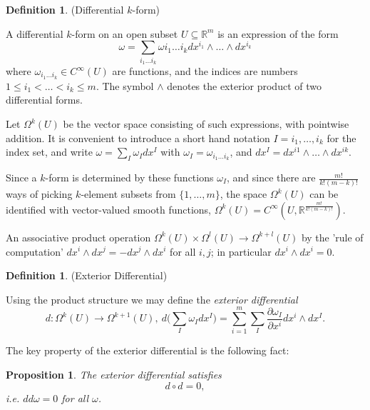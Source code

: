 \documentclass{article}
\newtheorem{proposition}{Proposition}[theorem]
\theoremstyle{definition}
\newtheorem{defn}[theorem]{Definition}
\newenvironment{definition}
  {\vspace{8pt}\begin{mdframed}[backgroundcolor=blueish,innertopmargin=4]\begin{defn}}
  {\end{defn}\end{mdframed}\vspace{4pt}}
\begin{document}
\begin{definition} (Differential $k$-form)

A differential $k$-form on an open subset $U \subseteq \mathbb R^m$ is an expression of the form 
\[
    \omega = \sum_{i_1 \dots i_k} \omega i_1\dots i_k dx^{i_1} \wedge \dots \wedge  dx^{i_k}
\] 
where $\omega_{i_1\dots i_k} \in C^\infty(U)$ are functions, and the indices are numbers $1 \leq i_1 < \dots < i_k \leq m$. The symbol $\wedge$ denotes the exterior product of two differential forms.
\end{definition}

Let $\Omega^k (U)$ be the vector space consisting of such expressions, with pointwise addition. It is convenient to introduce a short hand notation $I = {i_1,\dots,i_k}$ for the index set, and write $\omega = \sum_I \omega_I dx^I$ with $\omega_I = \omega_{i_1 \dots i_k}$, and $dx^I = dx^{i1} \wedge \dots \wedge dx^{ik}$.

Since a $k$-form is determined by these functions $\omega_I$, and since there are $\frac{m!}{k!(m-k)!}$ ways of picking $k$-element subsets from $\{1,\dots,m\}$, the space $\Omega^k (U)$ can be identified with vector-valued smooth functions, $\Omega^k (U) = C^\infty (U, \mathbb R ^{\frac{m!}{k!(m-k)!}})$.

An associative product operation $\Omega^k (U) \times \Omega^l (U) \rightarrow \Omega^{k+l} (U)$ by the 'rule of computation' $dx^i \wedge d x^j = -dx^j \wedge d x^i$ for all $i, j$;  in particular $dx^i \wedge dx^i = 0$.

\begin{definition}(Exterior Differential)

Using the product structure we may define the \textit{exterior differential}
\[
    d : \Omega^k (U) \rightarrow \Omega^{k+1}(U),  \ d \bigg ( \sum_I \omega_I dx^I \bigg ) = \sum_{i=1}^m \sum_I \frac{\partial \omega_I}{\partial x^i} dx^i \wedge dx^I.
\]
\end{definition}

The key property of the exterior differential is the following fact:
\begin{proposition}
The exterior differential satisfies
\[
    d \circ d = 0,
\]
i.e. $dd\omega = 0$ for all $\omega$.
\end{proposition}
\end{document}
